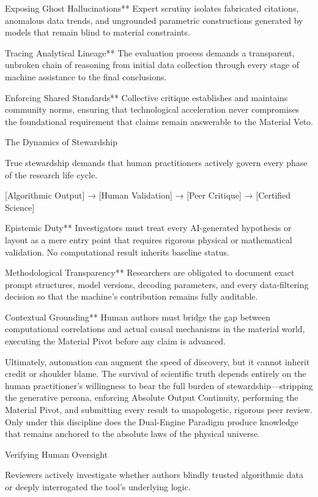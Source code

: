 Exposing Ghost Hallucinations**  
  Expert scrutiny isolates fabricated citations, anomalous data trends, and ungrounded parametric constructions generated by models that remain blind to material constraints.

Tracing Analytical Lineage**  
  The evaluation process demands a transparent, unbroken chain of reasoning from initial data collection through every stage of machine assistance to the final conclusions.

Enforcing Shared Standards**  
  Collective critique establishes and maintains community norms, ensuring that technological acceleration never compromises the foundational requirement that claims remain answerable to the Material Veto.

The Dynamics of Stewardship

True stewardship demands that human practitioners actively govern every phase of the research life cycle.

[Algorithmic Output] → [Human Validation] → [Peer Critique] → [Certified Science]

Epistemic Duty**  
  Investigators must treat every AI-generated hypothesis or layout as a mere entry point that requires rigorous physical or mathematical validation. No computational result inherits baseline status.

Methodological Transparency**  
  Researchers are obligated to document exact prompt structures, model versions, decoding parameters, and every data-filtering decision so that the machine’s contribution remains fully auditable.

Contextual Grounding**  
  Human authors must bridge the gap between computational correlations and actual causal mechanisms in the material world, executing the Material Pivot before any claim is advanced.

Ultimately, automation can augment the speed of discovery, but it cannot inherit credit or shoulder blame. The survival of scientific truth depends entirely on the human practitioner’s willingness to bear the full burden of stewardship—stripping the generative persona, enforcing Absolute Output Continuity, performing the Material Pivot, and submitting every result to unapologetic, rigorous peer review. Only under this discipline does the Dual-Engine Paradigm produce knowledge that remains anchored to the absolute laws of the physical universe.

Verifying Human Oversight

Reviewers actively investigate whether authors blindly trusted algorithmic data or deeply interrogated the tool’s underlying logic.

